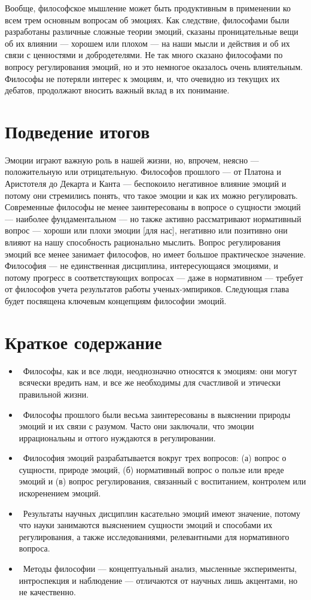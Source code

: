 \documentclass[11pt]{book}
\begin{document}
Вообще, философское мышление может быть продуктивным в применении ко всем трем основным вопросам об эмоциях. Как следствие, философами были разработаны различные сложные теории эмоций, сказаны проницательные вещи об их влиянии --- хорошем или плохом --- на наши мысли и действия и об их связи с ценностями и добродетелями. Не так много сказано философами по вопросу регулирования эмоций, но и это немногое оказалось очень влиятельным. Философы не потеряли интерес к эмоциям, и, что очевидно из текущих их дебатов, продолжают вносить важный вклад в их понимание.

\section{Подведение итогов}

Эмоции играют важную роль в нашей жизни, но, впрочем, неясно --- положительную или отрицательную. Философов прошлого --- от Платона и Аристотеля до Декарта и Канта --- беспокоило негативное влияние эмоций и потому они стремились понять, что такое эмоции и как их можно регулировать. Современные философы не менее заинтересованы в вопросе о сущности эмоций --- наиболее фундаментальном --- но также активно рассматривают нормативный вопрос --- хороши или плохи эмоции [для нас], негативно или позитивно они влияют на нашу способность рационально мыслить. Вопрос регулирования эмоций все менее занимает философов, но имеет большое практическое значение. Философия --- не единственная дисциплина, интересующаяся эмоциями, и потому прогресс в соответствующих вопросах --- даже в нормативном --- требует от философов учета результатов работы ученых-эмпириков. Следующая глава будет посвящена ключевым концепциям философии эмоций.

\section{Краткое содержание}

\begin{itemize}
  \item\ Философы, как и все люди, неоднозначно относятся к эмоциям: они могут всячески вредить нам, и все же необходимы для счастливой и этически правильной жизни.
  \item\ Философы прошлого были весьма заинтересованы в выяснении природы эмоций и их связи с разумом. Часто они заключали, что эмоции иррациональны и оттого нуждаются в регулировании.
  \item\ Философия эмоций разрабатывается вокруг трех вопросов: (а) вопрос о сущности, природе эмоций, (б) нормативный вопрос о пользе или вреде эмоций и (в) вопрос регулирования, связанный с воспитанием, контролем или искоренением эмоций.
  \item\ Результаты научных дисциплин касательно эмоций имеют значение, потому что науки занимаются выяснением сущности эмоций и способами их регулирования, а также исследованиями, релевантными для нормативного вопроса.
  \item\ Методы философии --- концептуальный анализ, мысленные эксперименты, интроспекция и наблюдение --- отличаются от научных лишь акцентами, но не качественно.

\end{itemize}
\end{document}
